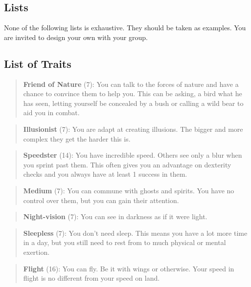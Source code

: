 \documentclass[11pt]{article}
\begin{document}
{\begin{multicols}{2}[]
\newpage
\section{Lists}
\label{sec:orgdcfb4b7}
None of the following lists is exhaustive. They should be taken as examples. You are invited to design your own with your group.

\subsection{List of Traits}
\label{sec:orgbd0bea8}
\begin{quote}
\textbf{Friend of Nature} (7): You can talk to the forces of nature and have a chance to convince them to help you. This can be asking, a bird what he has seen, letting yourself be concealed by a bush or calling a wild bear to aid you in combat.
\end{quote}

\begin{quote}
\textbf{Illusionist} (7): You are adapt at creating illusions. The bigger and more complex they get the harder this is.
\end{quote}

\begin{quote}
\textbf{Speedster} (14): You have incredible speed. Others see only a blur when you sprint past them. This often gives you an advantage on dexterity checks and you always have at least 1 success in them.
\end{quote}

\begin{quote}
\textbf{Medium} (7): You can commune with ghosts and spirits. You have no control over them, but you can gain their attention.
\end{quote}

\begin{quote}
\textbf{Night-vision} (7): You can see in darkness as if it were light.
\end{quote}

\begin{quote}
\textbf{Sleepless} (7): You don't need sleep. This means you have a lot more time in a day, but you still need to rest from to much physical or mental exertion.
\end{quote}

\begin{quote}
\textbf{Flight} (16): You can fly. Be it with wings or otherwise. Your speed in flight is no different from your speed on land.
\end{quote}


\end{multicols}}
\end{document}
